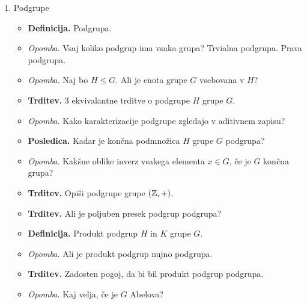 \begin{enumerate}
    \item Podgrupe
    \begin{itemize}
        \item \colorbox{purple!30}{\textbf{Definicija.}} Podgrupa.
        \item \colorbox{yellow!30}{\emph{Opomba.}} Vsaj koliko podgrup ima vsaka grupa? Trvialna podgrupa. Prava podgrupa.
        \item \colorbox{yellow!30}{\emph{Opomba.}} Naj bo $H \leq G$. Ali je enota grupe $G$ vsebovana v $H$?
        \item \colorbox{blue!30}{\textbf{Trditev.}} 3 ekvivalantne trditve o podgrupe $H$ grupe $G$.
        \item \colorbox{yellow!30}{\emph{Opomba.}} Kako karakterizacije podgrupe zgledajo v aditivnem zapisu?
        \item \colorbox{orange!30}{\textbf{Posledica.}} Kadar je končna podmnožica $H$ grupe $G$ podgrupa?
        \item \colorbox{yellow!30}{\emph{Opomba.}} Kakšne oblike inverz vsakega elementa $x \in G$, če je $G$ končna grupa?        
        \item \colorbox{blue!30}{\textbf{Trditev.}} Opiši podgrupe grupe $(\mathbb{Z}, +)$.
        \item \colorbox{blue!30}{\textbf{Trditev.}} Ali je poljuben presek podgrup podgrupa?
        \item \colorbox{purple!30}{\textbf{Definicija.}} Produkt podgrup $H$ in $K$ grupe $G$.
        \item \colorbox{yellow!30}{\emph{Opomba.}} Ali je produkt podgrup nujno podgrupa.
        \item \colorbox{blue!30}{\textbf{Trditev.}} Zadosten pogoj, da bi bil produkt podgrup podgrupa.
        \item \colorbox{yellow!30}{\emph{Opomba.}} Kaj velja, če je $G$ Abelova?
    \end{itemize}


\end{enumerate}
